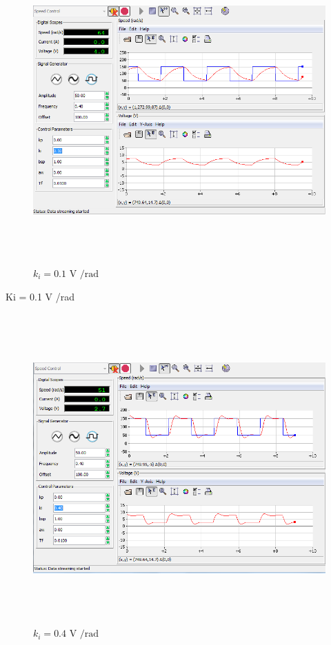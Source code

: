 \documentclass[]{article}
\begin{document}
\begin{figure}\includegraphics[width=6.50000in,height=4.63889in]{media/image59.png} \caption{$k_i = \text{0.1 V /rad}$} \end{figure}

Ki = 0.1 V /rad

\begin{figure}\includegraphics[width=6.50000in,height=4.69444in]{media/image43.png} \caption{$k_i = \text{0.4 V /rad}$} \end{figure}
\end{document}

